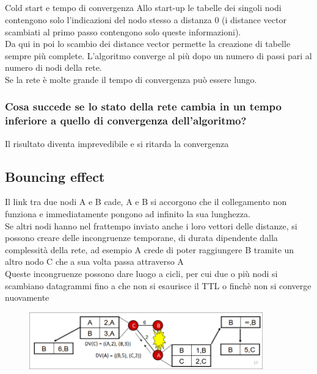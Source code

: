 \documentclass{report}
\begin{document}
            \subsection{}{Cold start e tempo di convergenza}
                Allo start-up le tabelle dei singoli nodi contengono solo l'indicazioni del nodo stesso a distanza 0 (i distance vector scambiati al primo passo contengono solo queste informazioni).
                \\
                Da qui in poi lo scambio dei distance vector permette la creazione di tabelle sempre più complete. L'algoritmo converge al più dopo un numero di passi pari al numero di nodi della rete.
                \\
                Se la rete è molte grande il tempo di convergenza può essere lungo.
                \subsubsection{Cosa succede se lo stato della rete cambia in un tempo inferiore a quello di convergenza dell’algoritmo?}
                    Il risultato diventa imprevedibile e si ritarda la convergenza
            \subsection{Bouncing effect}
                Il link tra due nodi A e B cade,  A e B si accorgono che il collegamento non funziona e immediatamente pongono ad infinito la sua lunghezza.
                \\
                Se altri nodi hanno nel frattempo inviato anche i loro vettori delle distanze, si possono creare delle incongruenze temporane, di durata dipendente dalla complessità della rete, ad esempio A crede di poter raggiungere B tramite un altro nodo C che a sua volta passa attraverso A
                \\
                Queste incongruenze possono dare luogo a cicli, per cui due o più nodi si scambiano datagrammi fino a che non si esaurisce il TTL o finchè non si converge nuovamente
                \begin{figure}[H]
                    \includegraphics[width=0.9\textwidth]{3/bouncing.png}
                \end{figure}
\end{document}
